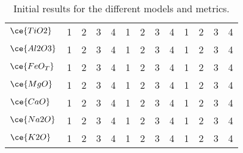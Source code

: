 \begin{table*}[]
{\begin{tabular}{l|cccc|cccc|cccc}
$\ce{TiO2}$  & \multicolumn{1}{c}{1}     & \multicolumn{1}{c}{2}           & \multicolumn{1}{c}{3}       & \multicolumn{1}{c|}{4}            & \multicolumn{1}{c}{1}     & \multicolumn{1}{c}{2}           & \multicolumn{1}{c}{3}       & \multicolumn{1}{c|}{4}            & \multicolumn{1}{c}{1}     & \multicolumn{1}{c}{2}           & \multicolumn{1}{c}{3}       & 4                             \\
$\ce{Al2O3}$ & \multicolumn{1}{c}{1}     & \multicolumn{1}{c}{2}           & \multicolumn{1}{c}{3}       & \multicolumn{1}{c|}{4}            & \multicolumn{1}{c}{1}     & \multicolumn{1}{c}{2}           & \multicolumn{1}{c}{3}       & \multicolumn{1}{c|}{4}            & \multicolumn{1}{c}{1}     & \multicolumn{1}{c}{2}           & \multicolumn{1}{c}{3}       & 4                             \\
$\ce{FeO_T}$ & \multicolumn{1}{c}{1}     & \multicolumn{1}{c}{2}           & \multicolumn{1}{c}{3}       & \multicolumn{1}{c|}{4}            & \multicolumn{1}{c}{1}     & \multicolumn{1}{c}{2}           & \multicolumn{1}{c}{3}       & \multicolumn{1}{c|}{4}            & \multicolumn{1}{c}{1}     & \multicolumn{1}{c}{2}           & \multicolumn{1}{c}{3}       & 4                             \\
$\ce{MgO}$   & \multicolumn{1}{c}{1}     & \multicolumn{1}{c}{2}           & \multicolumn{1}{c}{3}       & \multicolumn{1}{c|}{4}            & \multicolumn{1}{c}{1}     & \multicolumn{1}{c}{2}           & \multicolumn{1}{c}{3}       & \multicolumn{1}{c|}{4}            & \multicolumn{1}{c}{1}     & \multicolumn{1}{c}{2}           & \multicolumn{1}{c}{3}       & 4                             \\
$\ce{CaO}$   & \multicolumn{1}{c}{1}     & \multicolumn{1}{c}{2}           & \multicolumn{1}{c}{3}       & \multicolumn{1}{c|}{4}            & \multicolumn{1}{c}{1}     & \multicolumn{1}{c}{2}           & \multicolumn{1}{c}{3}       & \multicolumn{1}{c|}{4}            & \multicolumn{1}{c}{1}     & \multicolumn{1}{c}{2}           & \multicolumn{1}{c}{3}       & 4                             \\
$\ce{Na2O}$  & \multicolumn{1}{c}{1}     & \multicolumn{1}{c}{2}           & \multicolumn{1}{c}{3}       & \multicolumn{1}{c|}{4}            & \multicolumn{1}{c}{1}     & \multicolumn{1}{c}{2}           & \multicolumn{1}{c}{3}       & \multicolumn{1}{c|}{4}            & \multicolumn{1}{c}{1}     & \multicolumn{1}{c}{2}           & \multicolumn{1}{c}{3}       & 4                             \\
$\ce{K2O}$   & \multicolumn{1}{c}{1}     & \multicolumn{1}{c}{2}           & \multicolumn{1}{c}{3}       & \multicolumn{1}{c|}{4}            & \multicolumn{1}{c}{1}     & \multicolumn{1}{c}{2}           & \multicolumn{1}{c}{3}       & \multicolumn{1}{c|}{4}            & \multicolumn{1}{c}{1}     & \multicolumn{1}{c}{2}           & \multicolumn{1}{c}{3}       & 4                             \\
\hline
\end{tabular}%
}
\caption{Initial results for the different models and metrics.}
\end{table*}